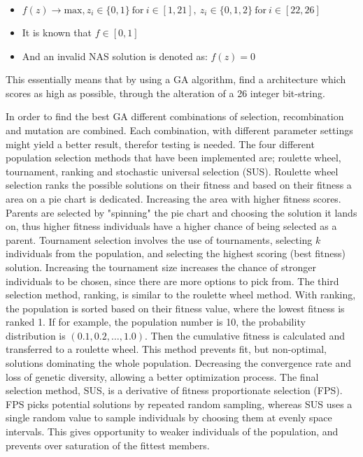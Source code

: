 \documentclass{article}
\begin{document}
\begin{itemize}
    \item $f(z) \to \text{max}, z_i \in \{0, 1\} \: \mathrm{for} \: i \in [1, 21], \: z_i \in \{0, 1, 2\} \: \mathrm{for} \: i \in [22, 26]$
    \item It is known that $f \in [0,1]$
    \item And an invalid NAS solution is denoted as: $f(z) = 0$
\end{itemize}

This essentially means that by using a GA algorithm, find a architecture which scores as high as possible, through the alteration of a 26 integer bit-string. 

In order to find the best GA different combinations of selection, recombination and mutation are combined. 
Each combination, with different parameter settings might yield a better result, therefor testing is needed. 
The four different population selection methods that have been implemented are; roulette wheel, tournament, ranking and stochastic universal selection (SUS). 
Roulette wheel selection ranks the possible solutions on their fitness and based on their fitness a area on a pie chart is dedicated. 
Increasing the area with higher fitness scores. 
Parents are selected by "spinning" the pie chart and choosing the solution it lands on, thus higher fitness individuals have a higher chance of being selected as a parent. 
Tournament selection involves the use of tournaments, selecting $k$ individuals from the population, and selecting the highest scoring (best fitness) solution. 
Increasing the tournament size increases the chance of stronger individuals to be chosen, since there are more options to pick from. 
The third selection method, ranking, is similar to the roulette wheel method. With ranking, the population is sorted based on their fitness value, where the lowest fitness is ranked 1.
If for example, the population number is 10, the probability distribution is $(0.1, 0.2, \dots, 1.0)$.
Then the cumulative fitness is calculated and transferred to a roulette wheel. 
This method prevents fit, but non-optimal, solutions dominating the whole population.
Decreasing the convergence rate and loss of genetic diversity, allowing a better optimization process. 
The final selection method, SUS, is a derivative of fitness proportionate selection (FPS). 
FPS picks potential solutions by repeated random sampling, whereas SUS uses a single random value to sample individuals by choosing them at evenly space intervals. 
This gives opportunity to weaker individuals of the population, and prevents over saturation of the fittest members.  
\end{document}
